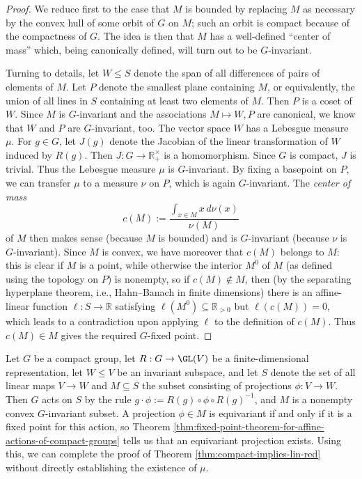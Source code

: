 \documentclass[reqno]{amsart} 
\begin{document}
\begin{proof}
  We reduce first to the case that $M$ is
  bounded by replacing $M$ as necessary by the convex hull
  of some orbit of $G$ on $M$; such an orbit is compact because of the compactness of $G$.
  The idea is then that $M$ has a well-defined ``center of mass''
  which, being canonically defined, will turn out to be $G$-invariant.

  Turning to details, let $W \leq S$ denote the span of all differences of pairs of
  elements
  of $M$.
  Let $P$ denote the smallest plane containing $M$,
  or equivalently,
  the union of all lines in $S$ containing at least two elements
  of $M$.
  Then $P$ is a coset of $W$.
  Since $M$ is $G$-invariant and the associations
  $M \mapsto W,P$ are canonical,
  we know that $W$ and $P$ are $G$-invariant, too.
  The vector space $W$ has a Lebesgue measure
  $\mu$.
  For $g \in G$,
  let $J(g)$ denote the Jacobian of the linear transformation
  of $W$ induced by $R(g)$.
  Then $J : G \rightarrow \mathbb{R}_+^\times$
  is a homomorphism.
  Since $G$ is compact, $J$ is trivial.
  Thus the Lebesgue measure $\mu$ is $G$-invariant.
  By fixing a basepoint on $P$,
  we can transfer $\mu$ to a measure $\nu$ on $P$,
  which is again $G$-invariant.
  The \emph{center of mass}
  \begin{equation*}
  c(M)
  :=
  \frac{\int_{x \in M} x \, d \nu(x)}{\nu(M)}
  \end{equation*}
  of $M$ then makes sense (because $M$ is bounded) and is
  $G$-invariant (because $\nu$ is $G$-invariant).
  Since $M$ is convex,
  we have moreover that
  $c(M)$ belongs to $M$:
  this is clear if $M$ is a point,
  while otherwise the interior $M^0$ of $M$ (as defined using the topology on $P$)
  is nonempty,
  so if $c(M) \notin M$, then
  (by the separating hyperplane theorem,
  i.e., Hahn--Banach in finite dimensions)
  there is an affine-linear function
  $\ell : S \rightarrow \mathbb{R}$ satisfying $\ell(M^0)
  \subseteq \mathbb{R}_{>0}$
  but $\ell(c(M)) = 0$,
  which leads to a contradiction upon applying $\ell$ to the
  definition of $c(M)$.
  Thus $c(M) \in M$ gives the required
  $G$-fixed point.
\end{proof}
\begin{example}\label{example:fixed-point-thm-gives-equivariant-projections}
  Let $G$ be a compact group,
  let $R : G \rightarrow \GL(V)$
  be a finite-dimensional representation,
  let $W \leq V$ be an invariant subspace,
  and let $S$
  denote the set of all linear maps $V \rightarrow W$
  and $M \subseteq S$ the subset consisting of projections $\phi
  : V  \rightarrow W$.
  Then $G$ acts on $S$ by the rule $g \cdot \phi :=  R(g) \circ \phi \circ R(g)^{-1}$,
  and $M$ is a nonempty convex $G$-invariant subset.
  A projection $\phi \in M$ is equivariant if and only
  if it is a fixed point for this action,
  so Theorem
  \ref{thm:fixed-point-theorem-for-affine-actions-of-compact-groups}
  tells us that an equivariant projection exists.
  Using this, we can complete the proof of Theorem
  \ref{thm:compact-implies-lin-red}
  without directly establishing the existence of $\mu$.
\end{example}
\end{document}
